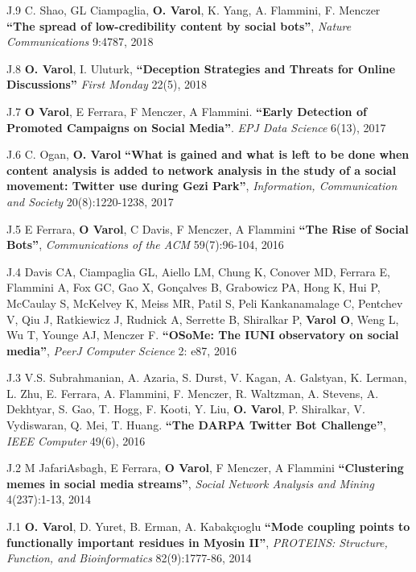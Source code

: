 \documentclass[10pt]{article}
\newenvironment{innerlist}[1][\enskip\textbullet]%
        {\begin{compactitem}[#1]}{\end{compactitem}}
\begin{document}
\begin{innerlist}
\item[J.9] C. Shao, GL Ciampaglia, \textbf{O. Varol}, K. Yang, A. Flammini, F. Menczer \textbf{``The spread of low-credibility content by social bots''}, \textit{Nature Communications} 9:4787, 2018

\item[J.8] \textbf{O. Varol}, I. Uluturk, \textbf{``Deception Strategies and Threats for Online Discussions''} \textit{First Monday} 22(5), 2018

\item[J.7] \textbf{O Varol}, E Ferrara, F Menczer, A Flammini. \textbf{``Early Detection of Promoted Campaigns on Social Media''}. \textit{EPJ Data Science} 6(13), 2017

\item[J.6] C. Ogan, \textbf{O. Varol} \textbf{``What is gained and what is left to be done when content analysis is added to network analysis in the study of a social movement: Twitter use during Gezi Park''}, \textit{Information, Communication and Society} 20(8):1220-1238, 2017

\item[J.5] E Ferrara, \textbf{O Varol}, C Davis, F Menczer, A Flammini \textbf{``The Rise of Social Bots''}, \textit{Communications of the ACM} 59(7):96-104, 2016

\item[J.4] Davis CA, Ciampaglia GL, Aiello LM, Chung K, Conover MD, Ferrara E, Flammini A, Fox GC, Gao X, Gonçalves B, Grabowicz PA, Hong K, Hui P, McCaulay S, McKelvey K, Meiss MR, Patil S, Peli Kankanamalage C, Pentchev V, Qiu J, Ratkiewicz J, Rudnick A, Serrette B, Shiralkar P, \textbf{Varol O}, Weng L, Wu T, Younge AJ, Menczer F. \textbf{``OSoMe: The IUNI observatory on social media''}, \textit{PeerJ Computer Science}  2: e87, 2016

\item[J.3] V.S. Subrahmanian, A. Azaria, S. Durst, V. Kagan, A. Galstyan, K. Lerman, L. Zhu, E. Ferrara, A. Flammini, F. Menczer, R. Waltzman, A. Stevens, A. Dekhtyar, S. Gao, T. Hogg, F. Kooti, Y. Liu, \textbf{O. Varol}, P. Shiralkar, V. Vydiswaran, Q. Mei, T. Huang. \textbf{``The DARPA Twitter Bot Challenge''}, \textit{IEEE Computer} 49(6), 2016

\item[J.2] M JafariAsbagh, E Ferrara, \textbf{O Varol}, F Menczer, A Flammini \textbf{``Clustering memes in social media streams''}, \textit{Social Network Analysis and Mining} 4(237):1-13, 2014

\item[J.1] \textbf{O. Varol}, D. Yuret, B. Erman, A. Kabak\c{c}{\i}oglu \textbf{``Mode coupling points to functionally important residues in Myosin II''}, \textit{PROTEINS: Structure, Function, and Bioinformatics} 82(9):1777-­86, 2014

\end{innerlist}
\vspace{3mm}
\end{document}

